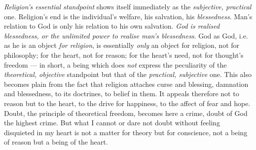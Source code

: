 \documentclass[12pt,a4paper]{book}
\begin{document}
\emph{Religion's essential standpoint} shows itself immediately as the
\emph{subjective, practical} one. Religion's end is the individual's welfare,
his salvation, his \emph{blessedness}. Man's relation to God is only his
relation to his own salvation. \emph{God is realised blessedness, or the
unlimited power to realise man's blessedness}. God as God, i.e. as he is an
object \emph{for religion}, is essentially \emph{only} an object for religion,
not for philosophy; for the heart, not for reason; for the heart's need, not
for thought's freedom --- in short, a being which does \emph{not} express the
peculiarity of the \emph{theoretical, objective} standpoint but that of the
\emph{practical, subjective} one. This also becomes plain from the fact that
religion attaches curse and blessing, damnation and blessedness, to its
doctrines, to belief in them. It appeals therefore not to reason but to the
heart, to the drive for happiness, to the affect of fear and hope. Doubt, the
principle of theoretical freedom, becomes here a crime, doubt of God the
highest crime. But what I cannot or dare not doubt without feeling disquieted
in my heart is not a matter for theory but for conscience, not a being of
reason but a being of the heart.
\end{document}

